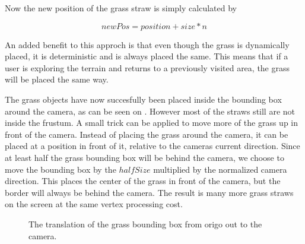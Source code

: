 Now the new position of the grass straw is simply calculated by 

\begin{displaymath}
  newPos = position + size * n
\end{displaymath}

An added benefit to this approch is that even though the grass is
dynamically placed, it is deterministic and is always placed the
same. This means that if a user is exploring the terrain and returns
to a previously visited area, the grass will be placed the same way.


The grass objects have now succesfully been placed inside the bounding
box around the camera, as can be seen on
. However most of the straws still are
not inside the frustum. A small trick can be applied to move more of
the grass up in front of the camera. Instead of placing the grass
around the camera, it can be placed at a position in front of it,
relative to the cameras current direction. Since at least half the
grass bounding box will be behind the camera, we choose to move the
bounding box by the $halfSize$ multiplied by the normalized camera
direction. This places the center of the grass in front of the camera,
but the border will always be behind the camera. The result is many
more grass straws on the screen at the same vertex processing cost.

\begin{figure}
  \centering
  \caption{The translation of the grass bounding box from origo out to the camera.}
  \label{fig:grassTranslation}
\end{figure}


